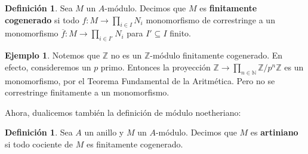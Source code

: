 \documentclass[12pt]{book}
\theoremstyle{definition}
\newtheorem{defn}[teo]{Definición}
\newtheorem{ex}[teo]{Ejemplo}
\newcommand{\ZZ}{\mathbb{Z}}      %
\begin{document}
\begin{defn}
Sea $M$ un $A$-módulo. Decimos que $M$ es \textbf{finitamente cogenerado} si todo $f:M\to\displaystyle\prod_{i\in I}N_i$ monomorfismo de correstringe a un monomorfismo $\overline{f}:M\to\displaystyle\prod_{i\in I'}N_i$ para $I'\subseteq I$ finito.
\end{defn}

\begin{ex}
Notemos que $\ZZ$ no es un $\ZZ$-módulo finitamente cogenerado. En efecto, consideremos un $p$ primo. Entonces la proyección $\ZZ\to\displaystyle\prod_{n\in\mathbb{N}} \ZZ/p^n \ZZ$ es un monomorfismo, por el Teorema Fundamental de la Aritmética. Pero no se correstringe finitamente a un monomorfismo.
\end{ex}

Ahora, dualicemos también la definición de módulo noetheriano:

\begin{defn}
Sea $A$ un anillo y $M$ un $A$-módulo. Decimos que $M$ es \textbf{artiniano} si todo cociente de $M$ es finitamente cogenerado.
\end{defn}
\end{document}
